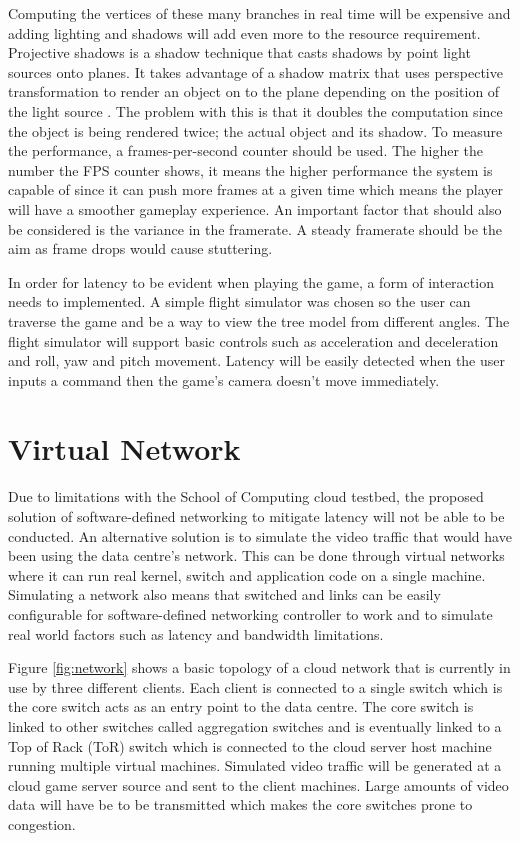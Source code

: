 Computing the vertices of these many branches in real time will be expensive and adding lighting and shadows will add even more to the resource requirement. Projective shadows is a shadow technique that casts shadows by point light sources onto planes. It takes advantage of a shadow matrix that uses perspective transformation to render an object on to the plane depending on the position of the light source \cite{hawkins2001opengl}. The problem with this is that it doubles the computation since the object is being rendered twice; the actual object and its shadow. To measure the performance, a frames-per-second counter should be used. The higher the number the FPS counter shows, it means the higher performance the system is capable of since it can push more frames at a given time which means the player will have a smoother gameplay experience. An important factor that should also be considered is the variance in the framerate. A steady framerate should be the aim as frame drops would cause stuttering.
\newline
\par
In order for latency to be evident when playing the game, a form of interaction needs to implemented. A simple flight simulator was chosen so the user can traverse the game and be a way to view the tree model from different angles. The flight simulator will support basic controls such as acceleration and deceleration and roll, yaw and pitch movement. Latency will be easily detected when the user inputs a command then the game's camera doesn't move immediately.

\section{Virtual Network}
Due to limitations with the School of Computing cloud testbed, the proposed solution of software-defined networking to mitigate latency will not be able to be conducted. An alternative solution is to simulate the video traffic that would have been using the data centre's network. This can be done through virtual networks where it can run real kernel, switch and application code on a single machine. Simulating a network also means that switched and links can be easily configurable for software-defined networking controller to work and to simulate real world factors such as latency and bandwidth limitations.
\newline
\par
Figure \ref{fig:network} shows a basic topology of a cloud network that is currently in use by three different clients. Each client is connected to a single switch which is the core switch acts as an entry point to the data centre. The core switch is linked to other switches called aggregation switches and is eventually linked to a Top of Rack (ToR) switch which is connected to the cloud server host machine running multiple virtual machines. Simulated video traffic will be generated at a cloud game server source and sent to the client machines. Large amounts of video data will have be to be transmitted which makes the core switches prone to congestion.

